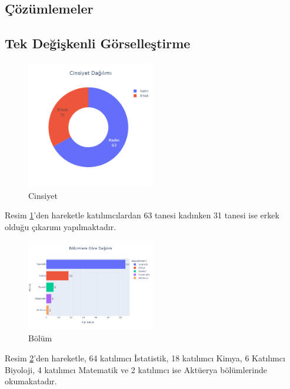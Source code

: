 \documentclass{article}
\begin{document}
\begin{twocolumn}
\section{Çözümlemeler}
\subsection{Tek Değişkenli Görselleştirme}

    \begin{figure}[htbp]
        \centering
        \includegraphics[width=0.5\textwidth]{Imgs/soru1.png}
        \caption{Cinsiyet}
        \label{soru1}
    \end{figure}    
Resim \ref{soru1}'den hareketle katılımcılardan 63 tanesi kadınken 31 tanesi ise erkek olduğu çıkarımı yapılmaktadır.

    \begin{figure}[htbp]
        \centering
        \includegraphics[width=0.5\textwidth]{Imgs/soru2-2.png}
        \caption{Bölüm}
        \label{soru2}
    \end{figure}
Resim \ref{soru2}'den hareketle, 64 katılımcı İstatistik, 18 katılımcı Kimya, 6 Katılımcı Biyoloji, 4 katılımcı Matematik ve 2 katılımcı ise Aktüerya bölümlerinde okumakatadır.


\end{twocolumn}
\end{document}
